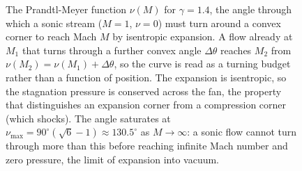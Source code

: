 \begin{figure}[htbp]
\centering
{}
\caption[The Prandtl-Meyer function]{The Prandtl-Meyer function
$\nu(M)$ for $\gamma=1.4$, the angle through which a sonic stream
($M=1$, $\nu=0$) must turn around a convex corner to reach Mach $M$ by
isentropic expansion. A flow already at $M_1$ that turns through a
further convex angle $\Delta\theta$ reaches $M_2$ from $\nu(M_2) =
\nu(M_1) + \Delta\theta$, so the curve is read as a turning budget
rather than a function of position. The expansion is isentropic, so the
stagnation pressure is conserved across the fan, the property that
distinguishes an expansion corner from a compression corner (which
shocks). The angle saturates at $\nu_{\max} = 90^{\circ}(\sqrt{6}-1)
\approx 130.5^{\circ}$ as $M\to\infty$: a sonic flow cannot turn
through more than this before reaching infinite Mach number and zero
pressure, the limit of expansion into vacuum.}
\label{fig:vol03ch13:prandtl-meyer}
\end{figure}

